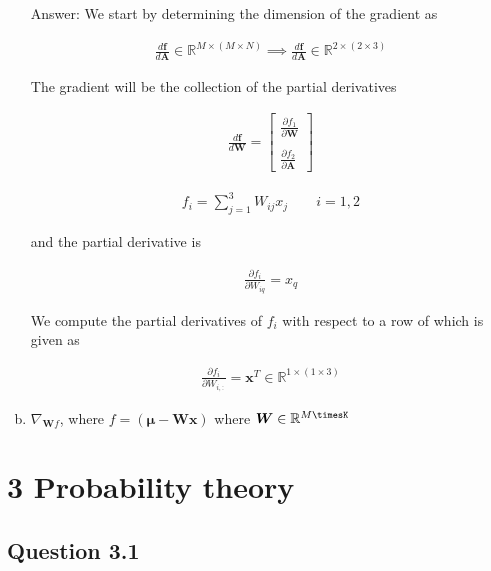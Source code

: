 \documentclass[12pt,letterpaper]{article}
\begin{document}
\begin{enumerate}[(a)]
    Answer:
    We start by determining the dimension of the gradient as
    
    \begin{align*}
        \frac{d \boldsymbol{f}}{d \boldsymbol{A}} \in \mathbb{R}^{M \times (M \times N)} \implies \frac{d \boldsymbol{f}}{d \boldsymbol{A}} \in \mathbb{R}^{2 \times (2 \times 3)}
    \end{align*}
    
    The gradient will be the collection of the partial derivatives
    
    \begin{align*}
        \frac{d\boldsymbol{f}}{d \boldsymbol{W}} = \begin{bmatrix} \frac{\partial f_1}{\partial \boldsymbol{W}} \\ \\ \frac{\partial f_2}{\partial \boldsymbol{A}}\end{bmatrix}
    \end{align*}
    
    \begin{align*}
        f_i = \sum_{j=1}^{3} W_{ij}x_j \qquad i = 1, 2
    \end{align*}
    
    and the partial derivative is
    
    \begin{align*}
        \frac{\partial f_i}{\partial W_{iq}} = x_q
    \end{align*}
    
    We compute the partial derivatives of $f_i$ with respect to a row of 
    which is given as 
    
    \begin{align*}
        \frac{\partial f_i}{\partial W_{i,:}} = \boldsymbol{x}^T \in \mathbb{R}^{1 \times (1 \times 3)}
    \end{align*}
    
    \item 
    $\nabla_{\boldsymbol{W}f}$, where $f = (\boldsymbol{\mu} - \boldsymbol{Wx})$ where $\boldsymbol{W} \in \mathbb{R}^{M\timesK}$
    
\end{enumerate}


\section*{3 Probability theory}

\subsection*{Question 3.1}
\end{document}
